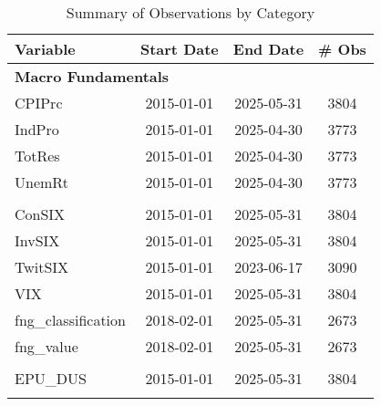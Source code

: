 \begin{table}[ht]
\centering
\scriptsize
\setlength{\tabcolsep}{4pt}
\begin{tabular}{lccc}
\toprule
Variable & Start Date & End Date & \# Obs \\
\midrule
\multicolumn{4}{l}{\textbf{Macro Fundamentals}} \\
CPIPrc & 2015-01-01 & 2025-05-31 & 3804 \\
IndPro & 2015-01-01 & 2025-04-30 & 3773 \\
TotRes & 2015-01-01 & 2025-04-30 & 3773 \\
UnemRt & 2015-01-01 & 2025-04-30 & 3773 \\
\addlinespace
\multicolumn{4}{l}{\textbf{Sentiment}} \\
ConSIX & 2015-01-01 & 2025-05-31 & 3804 \\
InvSIX & 2015-01-01 & 2025-05-31 & 3804 \\
TwitSIX & 2015-01-01 & 2023-06-17 & 3090 \\
VIX & 2015-01-01 & 2025-05-31 & 3804 \\
fng_classification & 2018-02-01 & 2025-05-31 & 2673 \\
fng_value & 2018-02-01 & 2025-05-31 & 2673 \\
\addlinespace
\multicolumn{4}{l}{\textbf{Uncertainty}} \\
EPU_DUS & 2015-01-01 & 2025-05-31 & 3804 \\
\addlinespace
\bottomrule
\end{tabular}
\caption{Summary of Observations by Category}
\label{tab:obs_by_category}
\end{table}
